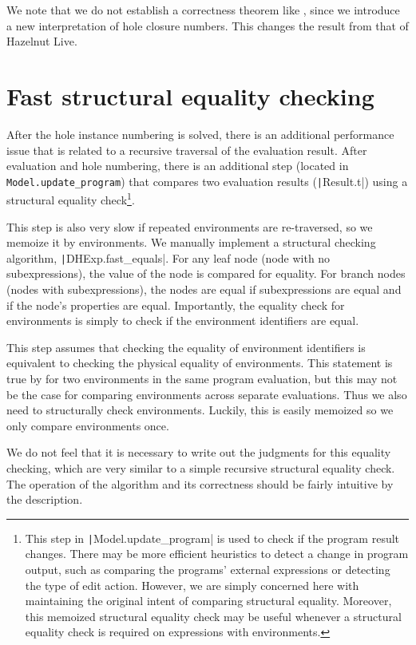 We note that we do not establish a correctness theorem like , since we introduce a new interpretation of hole closure numbers. This changes the result from that of Hazelnut Live.

\section{Fast structural equality checking}
\label{sec:fast-equals}

After the hole instance numbering is solved, there is an additional performance issue that is related to a recursive traversal of the evaluation result. After evaluation and hole numbering, there is an additional step (located in \texttt{Model.update_program}) that compares two evaluation results (\texttt|Result.t|) using a structural equality check\footnote{This step in \texttt|Model.update_program| is used to check if the program result changes. There may be more efficient heuristics to detect a change in program output, such as comparing the programs' external expressions or detecting the type of edit action. However, we are simply concerned here with maintaining the original intent of comparing structural equality. Moreover, this memoized structural equality check may be useful whenever a structural equality check is required on expressions with environments.}.

This step is also very slow if repeated environments are re-traversed, so we memoize it by environments. We manually implement a structural checking algorithm, \texttt|DHExp.fast_equals|. For any leaf node (node with no subexpressions), the value of the node is compared for equality. For branch nodes (nodes with subexpressions), the nodes are equal if subexpressions are equal and if the node's properties are equal. Importantly, the equality check for environments is simply to check if the environment identifiers are equal.

This step assumes that checking the equality of environment identifiers is equivalent to checking the physical equality of environments. This statement is true by  for two environments in the same program evaluation, but this may not be the case for comparing environments across separate evaluations. Thus we also need to structurally check environments. Luckily, this is easily memoized so we only compare environments once.

We do not feel that it is necessary to write out the judgments for this equality checking, which are very similar to a simple recursive structural equality check. The operation of the algorithm and its correctness should be fairly intuitive by the description.

